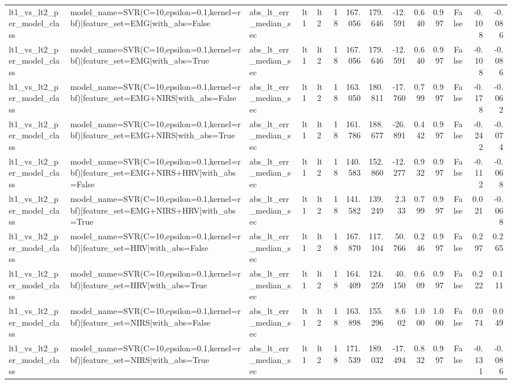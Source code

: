 \begin{table}
\begin{tabular}{lllllrrrrrrrrr}
lt1_vs_lt2_per_model_class & model_name=SVR(C=10,epsilon=0.1,kernel=rbf)|feature_set=EMG|with_abs=False & abs_lt_err_median_sec & lt1 & lt2 & 18 & 167.056 & 179.646 & -12.591 & 0.640 & 0.997 & False & -0.108 & -0.086 \\
lt1_vs_lt2_per_model_class & model_name=SVR(C=10,epsilon=0.1,kernel=rbf)|feature_set=EMG|with_abs=True & abs_lt_err_median_sec & lt1 & lt2 & 18 & 167.056 & 179.646 & -12.591 & 0.640 & 0.997 & False & -0.108 & -0.086 \\
lt1_vs_lt2_per_model_class & model_name=SVR(C=10,epsilon=0.1,kernel=rbf)|feature_set=EMG+NIRS|with_abs=False & abs_lt_err_median_sec & lt1 & lt2 & 18 & 163.050 & 180.811 & -17.760 & 0.799 & 0.997 & False & -0.178 & -0.062 \\
lt1_vs_lt2_per_model_class & model_name=SVR(C=10,epsilon=0.1,kernel=rbf)|feature_set=EMG+NIRS|with_abs=True & abs_lt_err_median_sec & lt1 & lt2 & 18 & 161.786 & 188.677 & -26.891 & 0.442 & 0.997 & False & -0.242 & -0.074 \\
lt1_vs_lt2_per_model_class & model_name=SVR(C=10,epsilon=0.1,kernel=rbf)|feature_set=EMG+NIRS+HRV|with_abs=False & abs_lt_err_median_sec & lt1 & lt2 & 18 & 140.583 & 152.860 & -12.277 & 0.932 & 0.997 & False & -0.112 & -0.068 \\
lt1_vs_lt2_per_model_class & model_name=SVR(C=10,epsilon=0.1,kernel=rbf)|feature_set=EMG+NIRS+HRV|with_abs=True & abs_lt_err_median_sec & lt1 & lt2 & 18 & 141.582 & 139.249 & 2.333 & 0.799 & 0.997 & False & 0.021 & -0.068 \\
lt1_vs_lt2_per_model_class & model_name=SVR(C=10,epsilon=0.1,kernel=rbf)|feature_set=HRV|with_abs=False & abs_lt_err_median_sec & lt1 & lt2 & 18 & 167.870 & 117.104 & 50.766 & 0.246 & 0.997 & False & 0.297 & 0.265 \\
lt1_vs_lt2_per_model_class & model_name=SVR(C=10,epsilon=0.1,kernel=rbf)|feature_set=HRV|with_abs=True & abs_lt_err_median_sec & lt1 & lt2 & 18 & 164.409 & 124.259 & 40.150 & 0.609 & 0.997 & False & 0.222 & 0.111 \\
lt1_vs_lt2_per_model_class & model_name=SVR(C=10,epsilon=0.1,kernel=rbf)|feature_set=NIRS|with_abs=False & abs_lt_err_median_sec & lt1 & lt2 & 18 & 163.898 & 155.296 & 8.602 & 1.000 & 1.000 & False & 0.074 & 0.049 \\
lt1_vs_lt2_per_model_class & model_name=SVR(C=10,epsilon=0.1,kernel=rbf)|feature_set=NIRS|with_abs=True & abs_lt_err_median_sec & lt1 & lt2 & 18 & 171.539 & 189.032 & -17.494 & 0.832 & 0.997 & False & -0.131 & -0.086 \\

\end{tabular}
\end{table}
